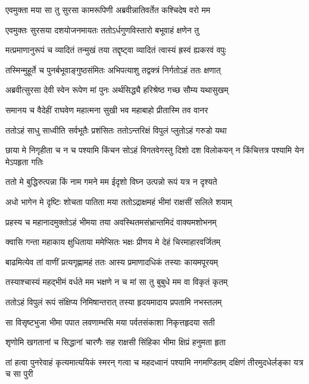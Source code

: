 \twolineshloka
{एवमुक्ता मया सा तु सुरसा कामरूपिणी}
{अब्रवीन्नातिवर्तेत कश्चिदेष वरो मम} %

\twolineshloka
{एवमुक्तः सुरसया दशयोजनमायतः}
{ततोऽर्धगुणविस्तारो बभूवाहं क्षणेन तु} %

\twolineshloka
{मत्प्रमाणानुरूपं च व्यादितं तन्मुखं तया}
{तद्दृष्ट्वा व्यादितं त्वास्यं ह्रस्वं ह्यकरवं वपुः} %

\twolineshloka
{तस्मिन्मुहूर्ते च पुनर्बभूवाङ्गुष्ठसंमितः}
{अभिपत्याशु तद्वक्त्रं निर्गतोऽहं ततः क्षणात्} %

\twolineshloka
{अब्रवीत्सुरसा देवी स्वेन रूपेण मां पुनः}
{अर्थसिद्ध्यै हरिश्रेष्ठ गच्छ सौम्य यथासुखम्} %

\twolineshloka
{समानय च वैदेहीं राघवेण महात्मना}
{सुखी भव महाबाहो प्रीतास्मि तव वानर} %

\twolineshloka
{ततोऽहं साधु साध्वीति सर्वभूतैः प्रशंसितः}
{ततोऽन्तरिक्षं विपुलं प्लुतोऽहं गरुडो यथा} %

\threelineshloka
{छाया मे निगृहीता च न च पश्यामि किंचन}
{सोऽहं विगतवेगस्तु दिशो दश विलोकयन्}
{न किंचित्तत्र पश्यामि येन मेऽपहृता गतिः} %

\twolineshloka
{ततो मे बुद्धिरुत्पन्ना किं नाम गमने मम}
{ईदृशो विघ्न उत्पन्नो रूपं यत्र न दृश्यते} %

\twolineshloka
{अधो भागेन मे दृष्टिः शोचता पातिता मया}
{ततोऽद्राक्षमहं भीमां राक्षसीं सलिले शयाम्} %

\twolineshloka
{प्रहस्य च महानादमुक्तोऽहं भीमया तया}
{अवस्थितमसंभ्रान्तमिदं वाक्यमशोभनम्} %

\twolineshloka
{क्वासि गन्ता महाकाय क्षुधिताया ममेप्सितः}
{भक्षः प्रीणय मे देहं चिरमाहारवर्जितम्} %

\twolineshloka
{बाढमित्येव तां वाणीं प्रत्यगृह्णामहं ततः}
{आस्य प्रमाणादधिकं तस्याः कायमपूरयम्} %

\twolineshloka
{तस्याश्चास्यं महद्भीमं वर्धते मम भक्षणे}
{न च मां सा तु बुबुधे मम वा विकृतं कृतम्} %

\twolineshloka
{ततोऽहं विपुलं रूपं संक्षिप्य निमिषान्तरात्}
{तस्या हृदयमादाय प्रपतामि नभस्तलम्} %

\twolineshloka
{सा विसृष्टभुजा भीमा पपात लवणाम्भसि}
{मया पर्वतसंकाशा निकृत्तहृदया सती} %

\twolineshloka
{शृणोमि खगतानां च सिद्धानां चारणैः सह}
{राक्षसी सिंहिका भीमा क्षिप्रं हनुमता हृता} %

\threelineshloka
{तां हत्वा पुनरेवाहं कृत्यमात्ययिकं स्मरन्}
{गत्वा च महदध्वानं पश्यामि नगमण्डितम्}
{दक्षिणं तीरमुदधेर्लङ्का यत्र च सा पुरी} %

